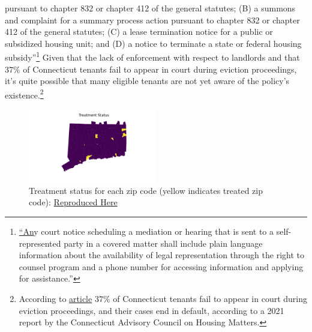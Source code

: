 \documentclass[a4paper,12pt]{article}
\begin{document}
{pursuant to chapter 832 or chapter 412 of the general statutes; (B) a
summons and complaint for a summary process action pursuant to
chapter 832 or chapter 412 of the general statutes; (C) a lease termination
notice for a public or subsidized housing unit; and (D) a notice to
terminate a state or federal housing subsidy''}\footnote{\href{https://www.cga.ct.gov/2021/ACT/PA/PDF/2021PA-00034-R00HB-06531-PA.PDF}{``An}y court notice scheduling a mediation or hearing that is sent to
a self-represented party in a covered matter shall include plain language
information about the availability of legal representation through the
right to counsel program and a phone number for accessing information
and applying for assistance.''} Given that the lack of enforcement with respect to landlords and that $37\%$ of Connecticut tenants fail to appear in court during eviction proceedings, it's quite possible that many eligible tenants are not yet aware of the policy's existence.\footnote{According to \href{https://www.ctpublic.org/news/2022-01-30/some-residents-facing-eviction-could-now-be-eligible-for-free-legal-aid}{article} $37\%$ of Connecticut tenants fail to appear in court during eviction proceedings, and their cases end in default, according to a 2021 report by the Connecticut Advisory Council on Housing Matters.}
\begin{figure}[htbp]
\centering
\includegraphics[width=0.5\textwidth]{figures/rtc/maps/zip_code_status.pdf}  
        \caption{Treatment status for each zip code (yellow indicates treated zip code): \href{https://github.com/pharringtonp19/evictions/blob/main/scripts/joint/maps/treatment_status.py}{Reproduced Here}}
\end{figure}
\end{document}
